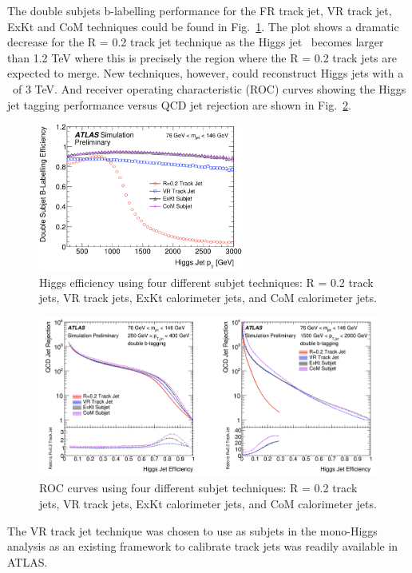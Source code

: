 \par The double subjets b-labelling performance for the FR track jet, VR track jet, ExKt and CoM techniques could be found in Fig.~\ref{fig:higgs_pt}.
The plot shows a dramatic decrease for the R = 0.2 track jet technique as the Higgs jet \pt~becomes larger than 1.2 TeV where this is precisely the region where the 
R = 0.2 track jets are expected to merge. 
New techniques, however, could reconstruct Higgs jets with a \pt~of 3 TeV. And receiver operating characteristic (ROC) curves showing the Higgs jet tagging performance versus 
QCD jet rejection are shown 
in Fig.~\ref{fig:higgs_ROC}.

\begin{figure}[htbp]
    \centering
    \includegraphics[width=0.6\textwidth]{chapters/c5/figures/higgs_pt}
    \caption{Higgs efficiency using four different subjet techniques: R = 0.2 track jets, VR track jets, ExKt calorimeter jets, and CoM calorimeter jets.}
    \label{fig:higgs_pt}
\end{figure}

\begin{figure}[htbp]
    \centering
    \includegraphics[width=1\textwidth]{chapters/c5/figures/higgs_ROC}
    \caption{ROC curves using four different subjet techniques: R = 0.2 track jets, VR track jets, ExKt calorimeter jets, and CoM calorimeter jets.}
    \label{fig:higgs_ROC}
\end{figure}

\par The VR track jet technique was chosen to use as subjets in the mono-Higgs analysis as an existing framework to calibrate track jets was readily available in ATLAS.












